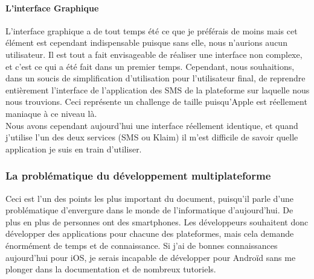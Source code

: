 \documentclass{article}
\begin{document}
		\paragraph{L'interface Graphique}
		L'interface graphique a de tout temps été ce que je préférais de moins mais cet élément est cependant indispensable puisque sans elle, nous n'aurions aucun utilisateur. Il est tout a fait envisageable de réaliser une interface non complexe, et c'est ce qui a été fait dans un premier temps. Cependant, nous souhaitions, dans un soucis de simplification d'utilisation pour l'utilisateur final, de reprendre entièrement l'interface de l'application des SMS de la plateforme sur laquelle nous nous trouvions. Ceci représente un challenge de taille puisqu'Apple est réellement maniaque à ce niveau là. \\
		
		Nous avons cependant aujourd'hui une interface réellement identique, et quand j'utilise l'un des deux services (SMS ou Klaim) il m'est difficile de savoir quelle application je suis en train d'utiliser.\\
		
\subsubsection{La problématique du développement multiplateforme}
		Ceci est l'un des points les plus important du document, puisqu'il parle d'une problématique d'envergure dans le monde de l'informatique d'aujourd'hui. De plus en plus de personnes ont des smartphones. Les développeurs souhaitent donc développer des applications pour chacune des plateformes, mais cela demande énormément de temps et de connaissance. Si j'ai de bonnes connaissances aujourd'hui pour iOS, je serais incapable de développer pour Androïd sans me plonger dans la documentation et de nombreux tutoriels. \\
		
\end{document}
